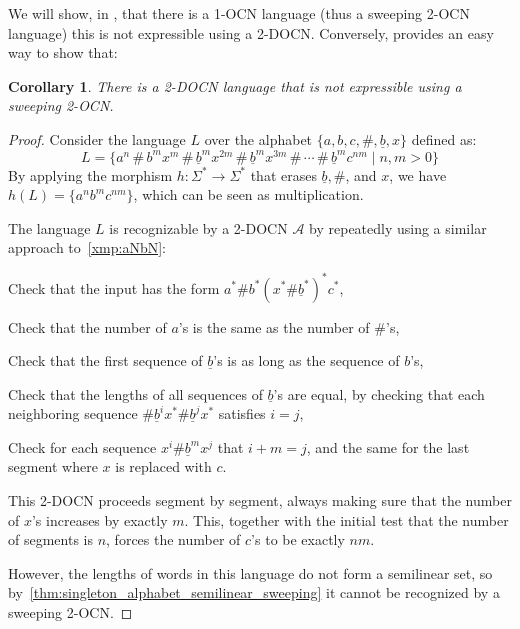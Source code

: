 \documentclass[11pt,a4paper]{amsart}
\newtheorem{corollary}[theorem]{Corollary}
\theoremstyle{definition}
\newcommand{\cA}{\mathcal{A}}
\begin{document}
We will show, in , that there is a 1-OCN language (thus
a sweeping 2-OCN language) this is not expressible using a 2-DOCN.  Conversely,
 provides an easy way to show that:
\begin{corollary}
	There is a 2-DOCN language that is not expressible using a sweeping 2-OCN.
\end{corollary}
\begin{proof}
	\def\ub{\underline{b}}%
	\def\ss{\,\#\,}%
	Consider the language \(L\) over the alphabet \(\{a, b, c, \#, \ub, x\}\) defined
	as:
	\[L = \{a^n\ss b^mx^m\ss\ub^mx^{2m}\ss\ub^mx^{3m}\ss\cdots\ss\ub^mc^{nm} \mid n, m > 0\}\]
	By applying the morphism $h\colon \Sigma^*\to \Sigma^*$ that erases $\ub,\#$, and $x$, we
	have $h(L) = \{a^nb^mc^{nm}\}$, which can be seen as multiplication.
	
	The language $L$ is recognizable by a 2-DOCN $\cA$ by repeatedly using a
	similar approach to~\cref{xmp:aNbN}:
	\begin{compactitem}
		\item Check that the input has the form \(a^*\#b^*(x^*\#\ub^*)^*c^*\),
		\item Check that the number of \(a\)'s is the same as the number of \(\#\)'s,
		\item Check that the first sequence of \(\ub\)'s is as long as the sequence of \(b\)'s,
		\item Check that the lengths of all sequences of \(\ub\)'s are equal, by checking that each neighboring sequence
		\(\#\ub^ix^*\#\ub^jx^*\) satisfies \(i = j\),
		\item Check for each sequence \(x^i\#\ub^mx^j\) that \(i + m = j\), and the same
		for the last segment where $x$ is replaced with $c$.
	\end{compactitem}
	This 2-DOCN proceeds segment by segment, always making sure that the number of
	$x$'s increases by exactly $m$. This, together with the initial test that the
	number of segments is $n$, forces the number of $c$'s to be exactly $nm$.
	
	However, the lengths of words in this language do not form a semilinear set,
	so by~\cref{thm:singleton_alphabet_semilinear_sweeping} it cannot be
	recognized by a sweeping 2-OCN.
\end{proof}
\end{document}

